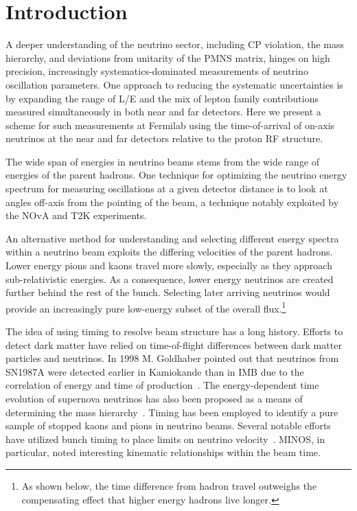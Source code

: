 
\section{Introduction}
A deeper understanding of the neutrino sector, including CP violation,
the mass hierarchy, and deviations from unitarity of the PMNS matrix,
hinges on high precision, increasingly systematics-dominated
measurements of neutrino oscillation parameters. One approach to
reducing the systematic uncertainties is by expanding the range of L/E
and the mix of lepton family contributions measured simultaneously in
both near and far detectors. Here we present a scheme for such
measurements at Fermilab using the time-of-arrival of on-axis
neutrinos at the near and far detectors relative to the proton RF
structure.

The wide span of energies in neutrino beams stems from the wide range
of energies of the parent hadrons.  One technique for optimizing
the neutrino energy spectrum for measuring oscillations at a given
detector distance is to look at angles off-axis from the pointing of
the beam, a technique notably exploited by the NOvA and T2K
experiments.

An alternative method for understanding and selecting different energy
spectra within a neutrino beam exploits the differing velocities of
the parent hadrons. Lower energy pions and kaons travel more slowly,
especially as they approach sub-relativistic energies. As a
consequence, lower energy neutrinos are created further behind the rest of
the bunch. Selecting later arriving neutrinos would provide an
increasingly pure low-energy subset of the overall flux.\footnote{As shown
below, the time difference from hadron travel outweighs the compensating
effect that higher energy hadrons live longer.}

The idea of using timing to resolve beam structure has a long
history. Efforts to detect dark matter have relied on time-of-flight
differences between dark matter particles and neutrinos. In 1998
M. Goldhaber pointed out that neutrinos from SN1987A were detected
earlier in Kamiokande than in IMB due to the correlation of energy and
time of production~\cite{mgoldhaber}. The energy-dependent time
evolution of supernova neutrinos has also been proposed as a means of
determining the mass hierarchy~\cite{Supernova_time_hierarchy}. Timing
has been employed to identify a pure sample of stopped kaons and pions
in neutrino beams. Several notable efforts have utilized bunch timing
to place limits on neutrino velocity~\cite{opera_2011}. MINOS, in
particular, noted interesting kinematic relationships within the beam
time.

